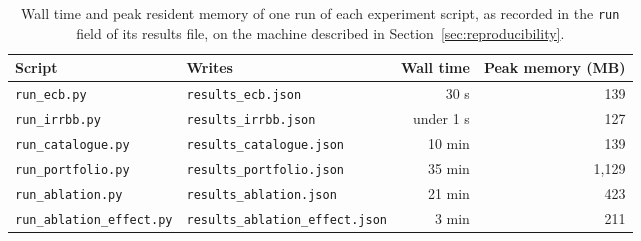 \begin{table}[htbp]
\centering
\small
\caption{Wall time and peak resident memory of one run of each experiment script, as recorded in the \texttt{run} field of its results file, on the machine described in Section~\ref{sec:reproducibility}.}
\label{tab:runs}
\begin{tabular}{llrr}
\toprule
Script & Writes & Wall time & Peak memory (MB) \\
\midrule
\texttt{run\_ecb.py} & \texttt{results\_ecb.json} & 30 s & 139 \\
\texttt{run\_irrbb.py} & \texttt{results\_irrbb.json} & under 1 s & 127 \\
\texttt{run\_catalogue.py} & \texttt{results\_catalogue.json} & 10 min & 139 \\
\texttt{run\_portfolio.py} & \texttt{results\_portfolio.json} & 35 min & 1,129 \\
\texttt{run\_ablation.py} & \texttt{results\_ablation.json} & 21 min & 423 \\
\texttt{run\_ablation\_effect.py} & \texttt{results\_ablation\_effect.json} & 3 min & 211 \\
\bottomrule
\end{tabular}
\end{table}
